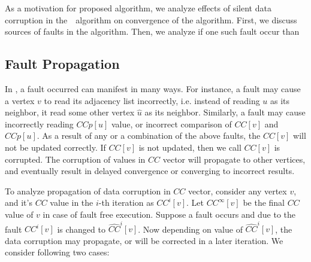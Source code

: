 

As a motivation for proposed algorithm, we analyze effects of silent data corruption in the~\sv~algorithm on convergence of the algorithm.
First, we discuss sources of faults in the \sv algorithm. Then, we analyze if one such fault occur than

\subsection{Fault Propagation}
In , a fault occurred can manifest in many ways. For instance, a fault may cause a vertex $v$ to read its adjacency
list incorrectly, i.e. instead of reading $u$ as its neighbor, it read some other vertex $\hat{u}$ as its neighbor. 
Similarly, a fault may cause incorrectly reading $CCp[u]$ value, or incorrect comparison of $CC[v]$ and $CCp[u]$. 
As a result of any or a combination of the above faults, the $CC[v]$ will not be updated correctly. 
If $CC[v]$ is not updated, then we call $CC[v]$ is corrupted. 
%
%
The corruption of values in $CC$ vector will propagate to other vertices, and eventually
result in delayed convergence or converging to incorrect results.



To analyze propagation of data corruption in $CC$ vector, consider any vertex $v$, and it's $CC$ value in the $i$-th 
iteration as $CC^{i}[v]$. Let $CC^{\infty}[v]$ be the final $CC$ value of $v$ in case of fault free execution. Suppose a fault occurs and due to the fault $CC^{i}[v]$ is changed to $\hat{CC}^{i}[v]$.
Now depending on value of $\hat{CC}^{i}[v]$, the data corruption may propagate, or will be corrected in a later iteration. We consider following two cases:

